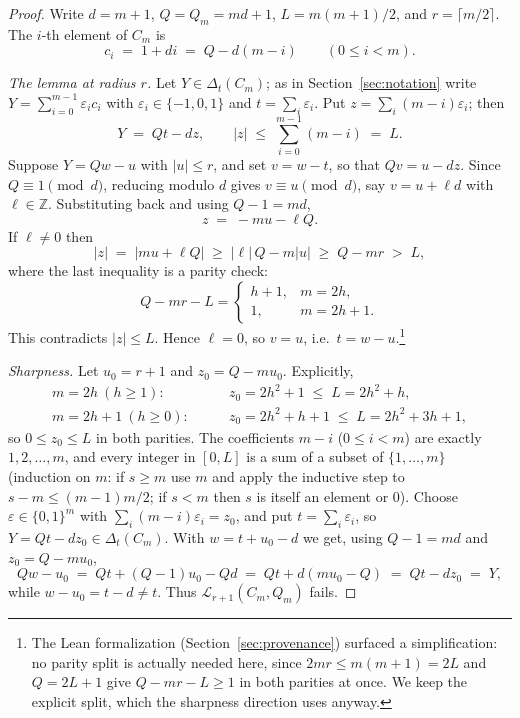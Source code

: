 \documentclass[11pt]{article}
\theoremstyle{definition}
\theoremstyle{remark}
\newcommand{\Z}{\mathbb{Z}}
\newcommand{\loc}[1]{\mathcal{L}_{#1}}
\begin{document}
\begin{proof}
Write $d=m+1$, $Q=Q_m=md+1$, $L=m(m+1)/2$, and $r=\lceil m/2\rceil$. The
$i$-th element of $C_m$ is
\[
c_i \;=\; 1+di \;=\; Q-d(m-i)\qquad(0\le i<m).
\]

\emph{The lemma at radius $r$.} Let $Y\in\Delta_t(C_m)$; as in
Section~\ref{sec:notation} write $Y=\sum_{i=0}^{m-1}\varepsilon_ic_i$ with
$\varepsilon_i\in\{-1,0,1\}$ and $t=\sum_i\varepsilon_i$. Put
$z=\sum_i(m-i)\varepsilon_i$; then
\[
Y \;=\; Qt-dz,
\qquad
|z|\;\le\;\sum_{i=0}^{m-1}(m-i)\;=\;L .
\]
Suppose $Y=Qw-u$ with $|u|\le r$, and set $v=w-t$, so that $Qv=u-dz$.
Since $Q\equiv1\pmod d$, reducing modulo $d$ gives $v\equiv u\pmod d$,
say $v=u+\ell d$ with $\ell\in\Z$. Substituting back and using $Q-1=md$,
\begin{equation}\label{eq:key}
z \;=\; -mu-\ell Q .
\end{equation}
If $\ell\ne0$ then
\[
|z| \;=\; |mu+\ell Q| \;\ge\; |\ell|\,Q-m|u| \;\ge\; Q-mr \;>\; L,
\]
where the last inequality is a parity check:
\[
Q-mr-L=
\begin{cases}
h+1, & m=2h,\\
1, & m=2h+1 .
\end{cases}
\]
This contradicts $|z|\le L$. Hence $\ell=0$, so $v=u$, i.e.\
$t=w-u$.\footnote{The Lean formalization (Section~\ref{sec:provenance})
surfaced a simplification: no parity split is actually needed here, since
$2mr\le m(m+1)=2L$ and $Q=2L+1$ give $Q-mr-L\ge1$ in both parities at
once. We keep the explicit split, which the sharpness direction uses
anyway.}

\emph{Sharpness.} Let $u_0=r+1$ and $z_0=Q-mu_0$. Explicitly,
\begin{align*}
m=2h\ (h\ge1):&\qquad z_0=2h^2+1\;\le\;L=2h^2+h,\\
m=2h+1\ (h\ge0):&\qquad z_0=2h^2+h+1\;\le\;L=2h^2+3h+1,
\end{align*}
so $0\le z_0\le L$ in both parities. The coefficients $m-i$
($0\le i<m$) are exactly $1,2,\dots,m$, and every integer in $[0,L]$ is a
sum of a subset of $\{1,\dots,m\}$ (induction on $m$: if $s\ge m$ use $m$
and apply the inductive step to $s-m\le(m-1)m/2$; if $s<m$ then $s$ is
itself an element or $0$). Choose $\varepsilon\in\{0,1\}^m$ with
$\sum_i(m-i)\varepsilon_i=z_0$, and put $t=\sum_i\varepsilon_i$, so
$Y=Qt-dz_0\in\Delta_t(C_m)$. With $w=t+u_0-d$ we get, using $Q-1=md$ and
$z_0=Q-mu_0$,
\[
Qw-u_0 \;=\; Qt+(Q-1)u_0-Qd \;=\; Qt+d(mu_0-Q) \;=\; Qt-dz_0 \;=\; Y,
\]
while $w-u_0=t-d\ne t$. Thus $\loc{r+1}(C_m,Q_m)$ fails.
\end{proof}
\end{document}

